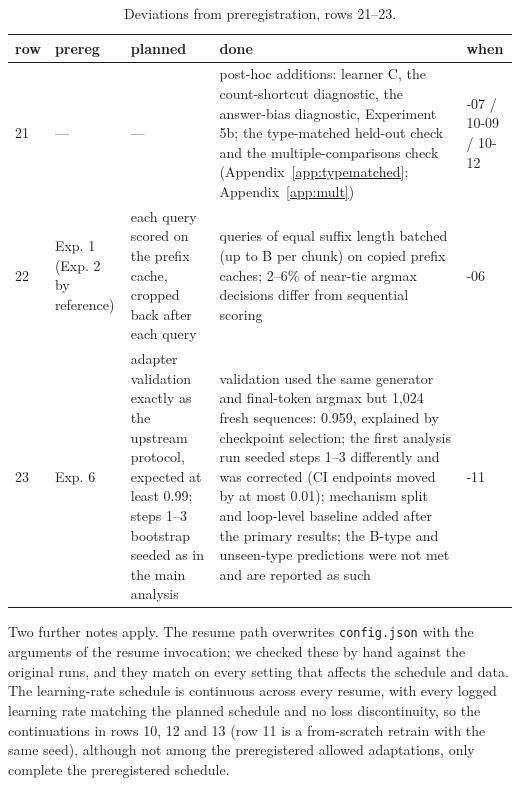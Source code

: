 \documentclass[11pt]{article}
\begin{document}
\begin{table}[tbp]
\centering
\small
\caption{Deviations from preregistration, rows 21--23.}\label{tab:app-dev-4}
\begin{tabularx}{\linewidth}{@{}l>{\raggedright\arraybackslash\hsize=0.5539\hsize}X>{\raggedright\arraybackslash\hsize=0.6644\hsize}X>{\raggedright\arraybackslash\hsize=2.4850\hsize}X>{\raggedright\arraybackslash\hsize=0.2967\hsize}X@{}}
\toprule
row & prereg & planned & done & when \\
\midrule
21 & --- & --- & post-hoc additions: learner C, the count-shortcut diagnostic, the answer-bias diagnostic, Experiment 5b; the type-matched held-out check and the multiple-comparisons check (Appendix~\ref{app:typematched}; Appendix~\ref{app:mult}) & 10-07 / 10-09 / 10-12 \\
22 & Exp. 1 (Exp. 2 by reference) & each query scored on the prefix cache, cropped back after each query & queries of equal suffix length batched (up to B per chunk) on copied prefix caches; 2--6\% of near-tie argmax decisions differ from sequential scoring & 10-06 \\
23 & Exp. 6 & adapter validation exactly as the upstream protocol, expected at least 0.99; steps 1--3 bootstrap seeded as in the main analysis & validation used the same generator and final-token argmax but 1,024 fresh sequences: 0.959, explained by checkpoint selection; the first analysis run seeded steps 1--3 differently and was corrected (CI endpoints moved by at most 0.01); mechanism split and loop-level baseline added after the primary results; the B-type and unseen-type predictions were not met and are reported as such & 10-11 \\
\bottomrule
\end{tabularx}
\end{table}

Two further notes apply. The resume path overwrites \texttt{config.json} with the arguments of the resume invocation; we checked these by hand against the original runs, and they match on every setting that affects the schedule and data. The learning-rate schedule is continuous across every resume, with every logged learning rate matching the planned schedule and no loss discontinuity, so the continuations in rows 10, 12 and 13 (row 11 is a from-scratch retrain with the same seed), although not among the preregistered allowed adaptations, only complete the preregistered schedule.
\end{document}
